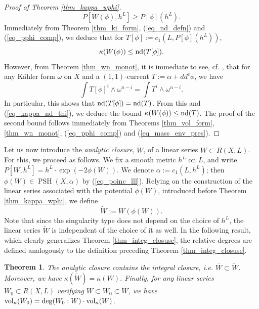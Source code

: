 \documentclass[12pt]{article}
\numberwithin{equation}{section}
\theoremstyle{theorem}
\newtheorem{thm}{Theorem}[section]
\theoremstyle{definition}
\theoremstyle{remark}
\newcommand{\psh}{\operatorname{PSH}}
\begin{document}
\begin{proof}[Proof of Theorem \ref{thm_kappa_wphi}]
\begin{equation}
			P[W(\phi), h^L] \geq P[\phi](h^L).
		\end{equation}
		Immediately from Theorem \ref{thm_ki_form}, (\ref{eq_nd_defn}) and (\ref{eq_pphi_comp}), we deduce that for $T[\phi] := c_1(L, P[\phi](h^L))$,
		\begin{equation}\label{eq_kappa_nd_thi}
			\kappa(W(\phi)) \leq {\rm{nd}}(T[\phi]).
		\end{equation}
		However, from Theorem \ref{thm_wn_monot}, it is immediate to see, cf. \cite[Remark 3.4]{DarvDiNezLuSingType}, that for any K\"ahler form $\omega$ on $X$ and a $(1, 1)$-current $T := \alpha + dd^c \phi$, we have
		\begin{equation}\label{eq_mass_env_pres}
			\int T[\phi]^i \wedge \omega^{n - i}
			=
			\int T^i \wedge \omega^{n - i}.
		\end{equation}
		In particular, this shows that ${\rm{nd}}(T[\phi]) = {\rm{nd}}(T)$.
		From this and (\ref{eq_kappa_nd_thi}), we deduce the bound $\kappa(W(\phi)) \leq {\rm{nd}}(T)$.
		The proof of the second bound follows immediately from Theorems \ref{thm_vol_form}, \ref{thm_wn_monot}, (\ref{eq_pphi_comp}) and (\ref{eq_mass_env_pres}).
	\end{proof}
	\par 
	Let us now introduce the \textit{analytic closure}, $\widetilde{W}$, of a linear series $W \subset R(X, L)$.
	For this, we proceed as follows.
	We fix a smooth metric $h^L$ on $L$, and write $P[W, h^L] = h^L \cdot \exp(- 2 \phi(W))$. 
	We denote $\alpha := c_1(L, h^L)$; then $\phi(W) \in \psh(X, \alpha)$ by (\ref{eq_poinc_lll}).
	Relying on the construction of the linear series associated with the potential $\phi(W)$, introduced before Theorem \ref{thm_kappa_wphi}, we define
	\begin{equation}
		\widetilde{W} := W(\phi(W)).
	\end{equation}
	Note that since the singularity type does not depend on the choice of $h^L$, the linear series $\widetilde{W}$ is independent of the choice of it as well.
	In the following result, which clearly generalizes Theorem \ref{thm_integ_closuse}, the relative degrees are defined analogously to the definition preceding Theorem \ref{thm_integ_closuse}.
	\begin{thm}\label{thm_anal_clos}
		The analytic closure contains the integral closure, i.e. $\overline{W} \subset \widetilde{W}$.
		Moreover, we have $\kappa(\widetilde{W}) = \kappa(W)$.
		Finally, for any linear series $W_0 \subset R(X, L)$ verifying $W \subset W_0 \subset \widetilde{W}$, we have ${\rm{vol}}_{\kappa}(W_0) = {\rm{deg}}(W_0 : W) \cdot {\rm{vol}}_{\kappa}(W)$.
	\end{thm}
\end{document}
